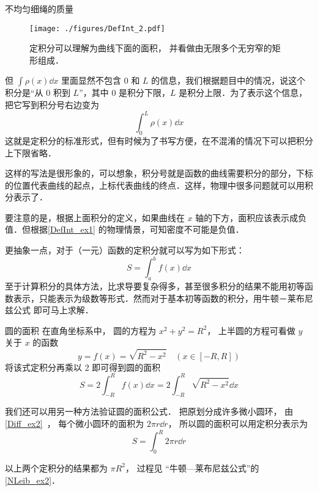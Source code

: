 \begin{example}{不均匀细绳的质量}
\begin{figure}[ht]
\centering
\texttt{[image: ./figures/DefInt\_2.pdf]}
\caption{定积分可以理解为曲线下面的面积， 并看做由无限多个无穷窄的矩形组成．} \label{DefInt_fig1} %
\end{figure}

但 $\int \rho(x) \dd{x}$ 里面显然不包含 $0$ 和 $L$ 的信息，我们根据题目中的情况，说这个积分是“从 $0$ 积到 $L$”，其中 $0$ 是积分下限，$L$ 是积分上限．为了表示这个信息，把它写到积分号右边变为
\begin{equation}
\int_0^L \rho(x) \dd{x}
\end{equation}
这就是定积分的标准形式，但有时候为了书写方便，在不混淆的情况下可以把积分上下限省略．
\end{example}

这样的写法是很形象的，可以想象，积分号就是函数的曲线需要积分的部分，下标的位置代表曲线的起点，上标代表曲线的终点．这样，物理中很多问题就可以用积分表示了．

要注意的是，根据上面积分的定义，如果曲线在 $x$ 轴的下方，面积应该表示成负值．但根据\autoref{DefInt_ex1} 的物理情景，可知密度不可能是负值．

更抽象一点，对于（一元）函数的定积分就可以写为如下形式：
\begin{equation}
S=\int^b_a f(x) \dd x
\end{equation}
至于计算积分的具体方法，比求导要复杂得多，甚至很多积分的结果不能用初等函数表示，只能表示为级数等形式．然而对于基本初等函数的积分，用牛顿－莱布尼兹公式 即可马上求解．

\begin{example}{圆的面积}\label{DefInt_ex2}
在直角坐标系中， 圆的方程为 $x^2 + y^2 = R^2$， 上半圆的方程可看做 $y$ 关于 $x$ 的函数
\begin{equation}
y = f(x) = \sqrt{R^2 - x^2} \quad (x\in [-R,R])
\end{equation}
将该式定积分再乘以 2 即可得到圆的面积
\begin{equation}
S = 2\int_{-R}^{R} f(x) \dd{x} = 2\int_{-R}^{R} \sqrt{R^2 - x^2} \dd{x}
\end{equation}

我们还可以用另一种方法验证圆的面积公式． 把原划分成许多微小圆环， 由\autoref{Diff_ex2}~， 每个微小圆环的面积为 $2\pi r\dd{r}$， 所以圆的面积可以用定积分表示为
\begin{equation}
S = \int_0^{R} 2\pi r\dd{r}
\end{equation}

以上两个定积分的结果都为 $\pi R^2$， 过程见 “牛顿—莱布尼兹公式”的\autoref{NLeib_ex2}．
\end{example}

